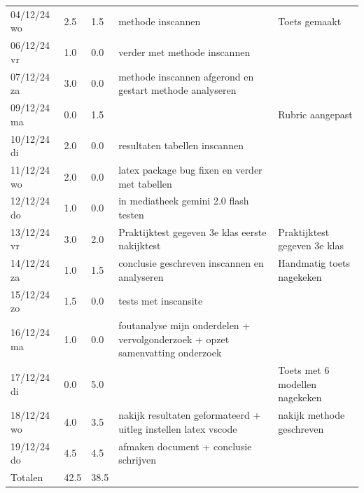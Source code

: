 \documentclass[12pt]{article}
\begin{document}
\begin{longtable}{@{}p{2.5cm} p{1cm} p{1.5cm} p{5cm} p{5cm}}
04/12/24 wo & 2.5 & 1.5 & methode inscannen & Toets gemaakt \\
06/12/24 vr & 1.0 & 0.0 & verder met methode inscannen &  \\
07/12/24 za & 3.0 & 0.0 & methode inscannen afgerond en gestart methode analyseren &  \\
09/12/24 ma & 0.0 & 1.5 &  & Rubric aangepast \\
10/12/24 di & 2.0 & 0.0 & resultaten tabellen inscannen &  \\
11/12/24 wo & 2.0 & 0.0 & latex package bug fixen en verder met tabellen &  \\
12/12/24 do & 1.0 & 0.0 & in mediatheek gemini 2.0 flash testen &  \\
13/12/24 vr & 3.0 & 2.0 & Praktijktest gegeven 3e klas eerste nakijktest & Praktijktest gegeven 3e klas \\
14/12/24 za & 1.0 & 1.5 & conclusie geschreven inscannen en analyseren & Handmatig toets nagekeken \\
15/12/24 zo & 1.5 & 0.0 & tests met inscansite &  \\
16/12/24 ma & 1.0 & 0.0 & foutanalyse mijn onderdelen + vervolgonderzoek + opzet samenvatting onderzoek &  \\
17/12/24 di & 0.0 & 5.0 &  & Toets met 6 modellen nagekeken \\
18/12/24 wo & 4.0 & 3.5 & nakijk resultaten geformateerd + uitleg instellen latex vscode & nakijk methode geschreven \\
19/12/24 do & 4.5 & 4.5 & afmaken document + conclusie schrijven &  \\
\midrule 
Totalen & 42.5 & 38.5 & & \\
\bottomrule
\end{longtable}
\normalsize
\end{document}
